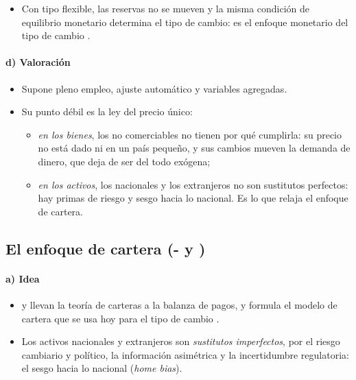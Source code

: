 \documentclass[11pt]{article}
\begin{document}
\begin{itemize}
\item Con tipo flexible, las reservas no se mueven y la misma condición de equilibrio monetario determina el tipo de cambio: es el enfoque monetario del tipo de cambio .
\end{itemize}

\paragraph{d) Valoración}

\begin{itemize}
\item Supone pleno empleo, ajuste automático y variables agregadas.
\item Su punto débil es la ley del precio único:
  \begin{itemize}
  \item \emph{en los bienes}, los no comerciables no tienen por qué cumplirla: su precio no está dado ni en un país pequeño, y sus cambios mueven la demanda de dinero, que deja de ser del todo exógena;
  \item \emph{en los activos}, los nacionales y los extranjeros no son sustitutos perfectos: hay primas de riesgo y sesgo hacia lo nacional. Es lo que relaja el enfoque de cartera.
  \end{itemize}
\end{itemize}

\subsection{El enfoque de cartera (- y )}\label{sec:cartera}

\paragraph{a) Idea}

\begin{itemize}
\item \textcite{McKinnonOates1966} y \textcite{Branson1968Financial} llevan la teoría de carteras a la balanza de pagos, y \textcite{Branson1977Asset} formula el modelo de cartera que se usa hoy para el tipo de cambio .
\item Los activos nacionales y extranjeros son \emph{sustitutos imperfectos}, por el riesgo cambiario y político, la información asimétrica y la incertidumbre regulatoria: el sesgo hacia lo nacional (\emph{home bias}).
\end{itemize}
\end{document}

